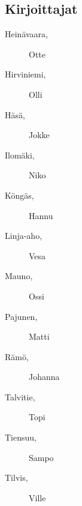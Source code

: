 \subsection*{Kirjoittajat}
\begin{description}
\item[Heinävaara, ] Otte
\item[Hirviniemi, ] Olli
\item[Häsä, ] Jokke
\item[Ilomäki, ] Niko
\item[Köngäs, ] Hannu
\item[Linja-aho, ] Vesa
\item[Mauno, ] Ossi
\item[Pajunen, ] Matti
\item[Rämö, ] Johanna
\item[Talvitie, ] Topi
\item[Tiensuu, ] Sampo
\item[Tilvis, ] Ville
\end{description}

